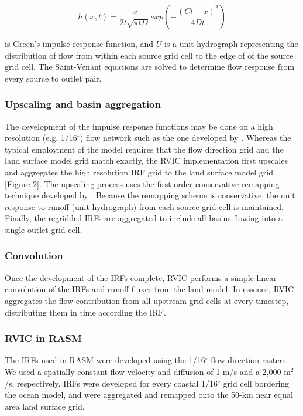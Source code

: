 \documentclass[jgrga, draft]{agutex}
\begin{document}
\begin{article}
 \begin{equation}
	h(x, t) = \frac{x}{2t\sqrt{\pi tD}}exp\left(-\frac{(Ct-x)^2}{4Dt}\right)
 \end{equation}

is Green’s impulse response function, and $U$ is a unit hydrograph representing the distribution of flow from within each source grid cell to the edge of of the source grid cell.
The Saint-Venant equations are solved to determine flow response from every source to outlet pair.

\subsubsection{Upscaling and basin aggregation}

The development of the impulse response functions may be done on a high resolution (e.g. 1/16$^{\circ}$) flow network such as the one developed by \citet{Wu_2011}.
Whereas the typical employment of the \citet{Lohmann_1996} model requires that the flow direction grid and the land surface model grid match exactly, the RVIC implementation first upscales and aggregates the high resolution IRF grid to the land surface model grid [Figure 2].
The upscaling process uses the first-order conservative remapping technique developed by \citep{Jones_1999}.
Because the remapping scheme is conservative, the unit response to runoff (unit hydrograph) from each source grid cell is maintained.
Finally, the regridded IRFs are aggregated to include all basins flowing into a single outlet grid cell.

\subsubsection{Convolution}

Once the development of the IRFs complete, RVIC performs a simple linear convolution of the IRFs and runoff fluxes from the land model.
In essence, RVIC aggregates the flow contribution from all upstream grid cells at every timestep, distributing them in time according the IRF.

\subsubsection{RVIC in RASM}

The IRFs used in RASM were developed using the \citet{Wu_2011} 1/16$^{\circ}$ flow direction rasters.
We used a spatially constant flow velocity and diffusion of 1 m/s and a 2,000 m$^2$/s, respectively.
IRFs were developed for every coastal 1/16$^{\circ}$ grid cell bordering the ocean model, and were aggregated and remapped onto the 50-km near equal area land surface grid.


\end{article}
\end{document}
